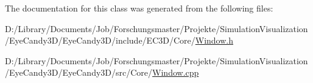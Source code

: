 The documentation for this class was generated from the following files\+:\begin{DoxyCompactItemize}
\item 
D\+:/\+Library/\+Documents/\+Job/\+Forschungsmaster/\+Projekte/\+Simulation\+Visualization/\+Eye\+Candy3\+D/\+Eye\+Candy3\+D/include/\+E\+C3\+D/\+Core/\mbox{\hyperlink{_window_8h}{Window.\+h}}\item 
D\+:/\+Library/\+Documents/\+Job/\+Forschungsmaster/\+Projekte/\+Simulation\+Visualization/\+Eye\+Candy3\+D/\+Eye\+Candy3\+D/src/\+Core/\mbox{\hyperlink{_window_8cpp}{Window.\+cpp}}\end{DoxyCompactItemize}
